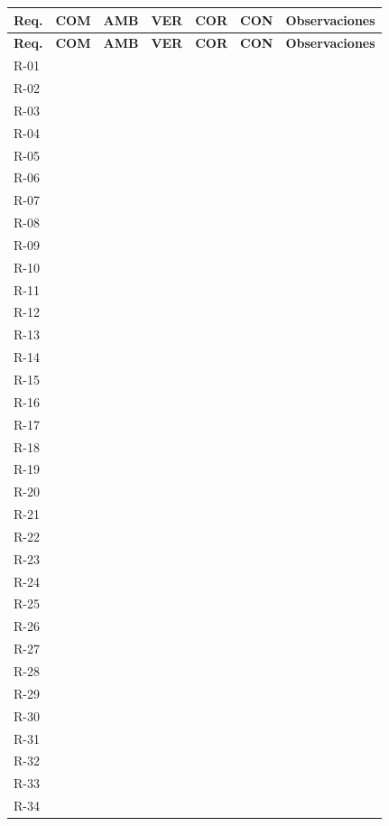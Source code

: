 \documentclass[11pt,a4paper]{article}
\begin{document}
\renewcommand{\arraystretch}{1.45}
\begin{longtable}{C{1.6cm} C{1.3cm} C{1.3cm} C{1.3cm} C{1.3cm} C{1.3cm} L{5.4cm}}
\toprule
{}
\textbf{Req.} & \textbf{COM} & \textbf{AMB} & \textbf{VER} & \textbf{COR} &
\textbf{CON} & \textbf{Observaciones} \\
\midrule
\endfirsthead
\toprule
{}
\textbf{Req.} & \textbf{COM} & \textbf{AMB} & \textbf{VER} & \textbf{COR} &
\textbf{CON} & \textbf{Observaciones} \\
\midrule
\endhead
\bottomrule
\endfoot
R-01 & & & & & & \\
R-02 & & & & & & \\
R-03 & & & & & & \\
R-04 & & & & & & \\
R-05 & & & & & & \\
R-06 & & & & & & \\
R-07 & & & & & & \\
R-08 & & & & & & \\
R-09 & & & & & & \\
R-10 & & & & & & \\
R-11 & & & & & & \\
R-12 & & & & & & \\
R-13 & & & & & & \\
R-14 & & & & & & \\
R-15 & & & & & & \\
R-16 & & & & & & \\
R-17 & & & & & & \\
R-18 & & & & & & \\
R-19 & & & & & & \\
R-20 & & & & & & \\
R-21 & & & & & & \\
R-22 & & & & & & \\
R-23 & & & & & & \\
R-24 & & & & & & \\
R-25 & & & & & & \\
R-26 & & & & & & \\
R-27 & & & & & & \\
R-28 & & & & & & \\
R-29 & & & & & & \\
R-30 & & & & & & \\
R-31 & & & & & & \\
R-32 & & & & & & \\
R-33 & & & & & & \\
R-34 & & & & & & \\

\end{longtable}
\end{document}
